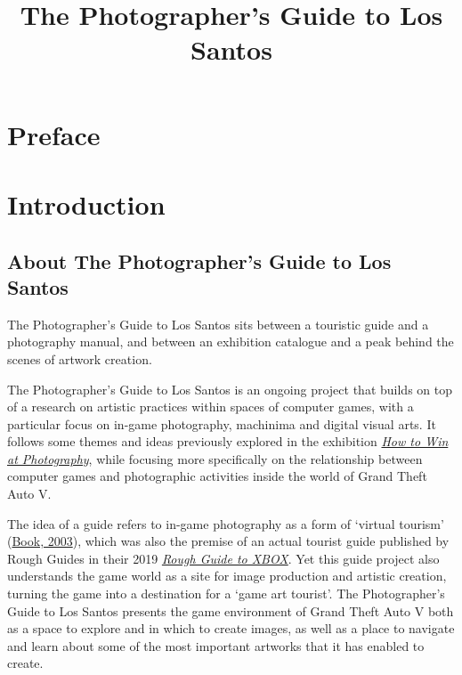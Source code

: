 \documentclass[
  openany]{book}
\title{The Photographer's Guide to Los Santos}
\author{}
\date{\vspace{-2.5em}}
\begin{document}
\maketitle

{
\setcounter{tocdepth}{1}
\tableofcontents
}
\hypertarget{preface}{%
\chapter*{Preface}\label{preface}}

\hypertarget{introduction}{%
\chapter{Introduction}\label{introduction}}

\hypertarget{about-the-photographers-guide-to-los-santos}{%
\section*{About The Photographer's Guide to Los Santos}\label{about-the-photographers-guide-to-los-santos}}

The Photographer's Guide to Los Santos sits between a touristic guide and a photography manual, and between an exhibition catalogue and a peak behind the scenes of artwork creation.

The Photographer's Guide to Los Santos is an ongoing project that builds on top of a research on artistic practices within spaces of computer games, with a particular focus on in-game photography, machinima and digital visual arts. It follows some themes and ideas previously explored in the exhibition \href{https://www.howtowinat.photography/}{\emph{How to Win at Photography}}, while focusing more specifically on the relationship between computer games and photographic activities inside the world of Grand Theft Auto V.

The idea of a guide refers to in-game photography as a form of `virtual tourism' (\href{https://papers.ssrn.com/sol3/papers.cfm?abstract_id=538182}{Book, 2003}), which was also the premise of an actual tourist guide published by Rough Guides in their 2019 \href{https://www.roughguides.com/articles/introduction-to-the-rough-guide-to-xbox/}{\emph{Rough Guide to XBOX}}. Yet this guide project also understands the game world as a site for image production and artistic creation, turning the game into a destination for a `game art tourist'. The Photographer's Guide to Los Santos presents the game environment of Grand Theft Auto V both as a space to explore and in which to create images, as well as a place to navigate and learn about some of the most important artworks that it has enabled to create.
\end{document}

